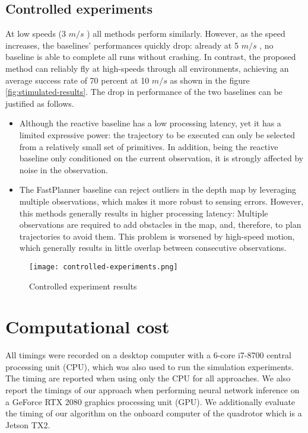 \subsection{Controlled experiments}
At
low speeds (3 $m/s$ ) all methods perform similarly. However, as the
speed increases, the baselines’ performances quickly drop: already at
5 $m/s$ , no baseline is able to complete all runs without crashing. In
contrast, the proposed method can reliably fly at high-speeds through all environments, achieving an average success rate of 70 percent at 10 $m/s$ as shown in the figure \ref{fig:stimulated-results}. The
drop in performance of the two baselines can be justified as follows.
\begin{itemize}
	\item Although the reactive baseline has a low processing latency, yet it has a limited expressive power: the trajectory to be executed can only be selected from a relatively small set of primitives. In addition, being the reactive baseline only conditioned on the current observation, it is strongly affected by noise in the observation.
	\item The FastPlanner baseline can reject outliers
in the depth map by leveraging multiple observations, which makes it
more robust to sensing errors. However, this methods generally results in higher processing latency: Multiple observations are required to add
obstacles in the map, and, therefore, to plan trajectories to avoid them.
This problem is worsened by high-speed motion, which generally results in little overlap between consecutive observations.
\end{itemize}

\begin{figure}[!h]
	\texttt{[image: controlled-experiments.png]}
	\caption{Controlled experiment results}
	\label{fig:stimulated_results}
\end{figure}


\section{Computational cost}

All timings were recorded on a desktop computer
with a 6-core i7-8700 central processing unit (CPU), which was also
used to run the simulation experiments. The timing are reported when using only the CPU for all approaches.
We also report the timings of our approach when performing neural
network inference on a GeForce RTX 2080 graphics processing unit
(GPU). We additionally
evaluate the timing of our algorithm on the onboard computer of the
quadrotor which is a Jetson TX2.

